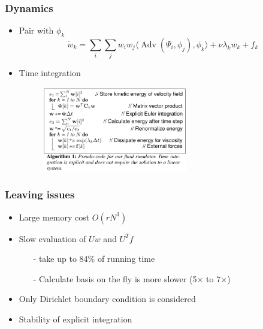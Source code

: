 \documentclass[serif,mathserif, 12pt]{beamer}
\DeclareMathOperator{\Adv}{Adv}
\begin{document}
\begin{frame}
  \frametitle{Dynamics}
  \begin{itemize}
  \item Pair with $\phi_k$
    \[
    \dot w_k = \sum_i\sum_j w_i w_j\langle \Adv(\Psi_i, \phi_j),\phi_k\rangle + \nu \lambda_k w_k  + f_k
    \]
    \pause
  \item Time integration
    \begin{figure}
      \centering
      \includegraphics[width=0.6\textwidth]{img/time_integration}
    \end{figure}
  \end{itemize}
\end{frame}

\begin{frame}
  \frametitle{Leaving issues}
  \begin{itemize}
  \item Large memory cost $O(rN^3)$
    \pause
  \item Slow evaluation of $Uw$ and $U^Tf$
    \pause
    \begin{itemize}
    \item[-] take up to 84\% of running time
      \pause
    \item[-] Calculate basis on the fly is more slower (5$\times$ to 7$\times$)
      \pause
    \end{itemize}
  \item Only Dirichlet boundary condition is considered
    \pause
  \item Stability of explicit integration
    \pause
  \end{itemize}
\end{frame}

\begin{frame} 
\end{frame}
\end{document}

